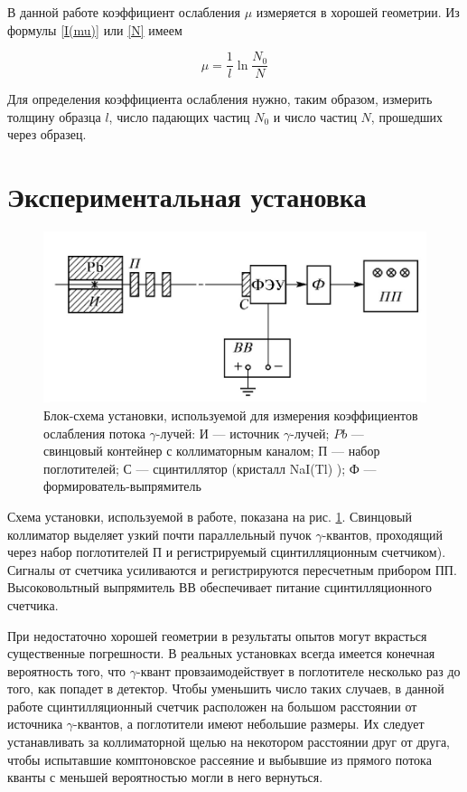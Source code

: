 \documentclass[a4paper, 12pt]{article}%
\begin{document}
	В данной работе коэффициент ослабления $ \mu $ измеряется в хорошей
	геометрии. Из формулы \eqref{I(mu)} или \eqref{N} имеем
	
	\begin{equation}\label{mu}
	\mu = \dfrac{1}{l} \ln{\dfrac{N_0}{N}}
	\end{equation}
	
	Для определения коэффициента ослабления нужно, таким образом, измерить толщину образца $ l $, число падающих частиц $ N_0 $ и число
	частиц $ N $, прошедших через образец.
	
	\section*{Экспериментальная установка}
	
		\begin{figure}[h!]
		\centering
		\includegraphics[width=0.7\linewidth]{4.jpg}
		\caption{Блок-схема установки, используемой для измерения коэффициентов ослабления потока $\gamma$-лучей: И --- источник $\gamma$-лучей; $ Pb $ --- свинцовый контейнер с коллиматорным каналом; П --- набор поглотителей; С --- сцинтиллятор (кристалл
			NaI(Tl) ); Ф --- формирователь-выпрямитель}
		\label{ris lab}
	\end{figure}

Схема установки, используемой в работе, показана на рис. \ref{ris lab}. Свинцовый коллиматор выделяет узкий почти параллельный пучок $\gamma$-квантов, проходящий через набор поглотителей П и регистрируемый сцинтилляционным счетчиком). Сигналы от счетчика усиливаются и регистрируются пересчетным прибором ПП. Высоковольтный выпрямитель ВВ обеспечивает питание сцинтилляционного счетчика.

При недостаточно хорошей геометрии в результаты опытов могут
вкрасться существенные погрешности. В реальных установках всегда имеется конечная вероятность того, что $\gamma$-квант провзаимодействует в
поглотителе несколько раз до того, как попадет в детектор. Чтобы уменьшить число таких случаев, в данной работе сцинтилляционный счетчик расположен на большом расстоянии от источника $\gamma$-квантов, а поглотители имеют небольшие размеры. Их следует устанавливать за коллиматорной щелью на некотором расстоянии друг от друга, чтобы испытавшие комптоновское рассеяние и выбывшие из прямого потока кванты с меньшей вероятностью могли в него вернуться.
\end{document}
